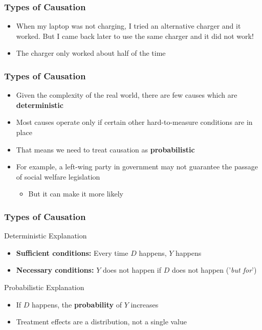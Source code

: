\documentclass[xcolor=x11names,compress]{beamer}\usepackage[]{graphicx}\usepackage[]{xcolor}
\renewcommand{\(}{\begin{columns}}
\renewcommand{\)}{\end{columns}}
\newcommand{\<}[1]{\begin{column}{#1}}
\renewcommand{\>}{\end{column}}
\begin{document}
\begin{frame}
\frametitle{Types of Causation}
\begin{itemize}
\item When my laptop was not charging, I tried an alternative charger and it worked. But I came back later to use the same charger and it did not work! 
\pause
\item The charger only worked about half of the time
\end{itemize}
\end{frame}

\begin{frame}
\frametitle{Types of Causation}
\begin{itemize}
\item Given the complexity of the real world, there are few causes which are \textbf{deterministic}
\pause
\item Most causes operate only if certain other hard-to-measure conditions are in place
\pause
\item That means we need to treat causation as \textbf{probabilistic}
\pause
\item For example, a left-wing party in government may not guarantee the passage of social welfare legislation
\begin{itemize}
\item But it can make it more likely
\end{itemize}
\end{itemize}
\end{frame}

\begin{frame}
\frametitle{Types of Causation}
\begin{multicols}{2}
\textcolor{dkblue}{Deterministic Explanation}
\pause
\begin{itemize}
\item \textbf{Sufficient conditions:} Every time $D$ happens, $Y$ happens
\pause
\item \textbf{Necessary conditions:} $Y$ does not happen if $D$ does not happen ('\textit{but for}')
\end{itemize}
\pause
\columnbreak
\textcolor{dkblue}{Probabilistic Explanation}
\pause
\begin{itemize}
\item If $D$ happens, the \textbf{probability} of $Y$ increases
\pause
\item Treatment effects are a distribution, not a single value
\end{itemize}
\end{multicols}
\end{frame}
\end{document}

